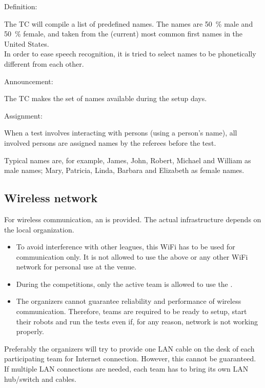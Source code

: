 \begin{enumerate}
	{\bf\item Definition:} The TC will compile a list of \NumNames predefined names. The names are \SI{50}{\percent} male and \SI{50}{\percent} female, and taken from the (current) most common first names in the United States.\\
	In order to ease speech recognition, it is tried to select names to be phonetically different from each other.

	{\bf\item Announcement:} The TC makes the set of names available during the setup days.
	{\bf\item Assignment:} When a test involves interacting with persons (using a person's name), all involved persons are assigned names by the referees before the test. 
\end{enumerate}

Typical names are, for example, James, John, Robert, Michael and William as male names; Mary, Patricia, Linda, Barbara and Elizabeth as female names.


\subsection{Wireless network}
\label{rule:scenario_wifi}

For wireless communication, an  is provided. The actual infrastructure depends on the local organization. 

\begin{itemize}
	\item To avoid interference with other leagues, this WiFi has to be used for communication only. It is not allowed to use the above or any other WiFi network for personal use at the venue.
	\item During the competitions, only the active team is allowed to use the . 
	\item The organizers cannot guarantee reliability and performance of wireless communication. Therefore, teams are required to be ready to setup, start their robots and run the tests even if, for any reason, network is not working properly.
\end{itemize}

Preferably the organizers will try to provide one LAN cable on the desk of each participating team for Internet connection. However, this cannot be guaranteed. If multiple LAN connections are needed, each team has to bring its own LAN hub/switch and cables.

